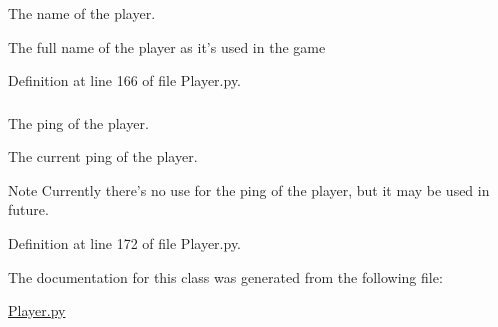 The name of the player. 

The full name of the player as it's used in the game 

Definition at line 166 of file Player.py.

\hypertarget{class_player_1_1_player_ab675ec89c8e17a56d85f0304f46465ea}{
\subsubsection[{ping}]{}}
\label{class_player_1_1_player_ab675ec89c8e17a56d85f0304f46465ea}


The ping of the player. 

The current ping of the player. \begin{DoxyNote}{Note}
Currently there's no use for the ping of the player, but it may be used in future. 
\end{DoxyNote}


Definition at line 172 of file Player.py.



The documentation for this class was generated from the following file:\begin{DoxyCompactItemize}
\item 
\hyperlink{_player_8py}{Player.py}\end{DoxyCompactItemize}
